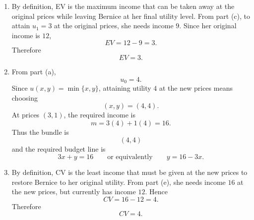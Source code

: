 \documentclass[12pt]{article}
\begin{document}
\begin{enumerate}[label=(\alph*)]
\begin{center}
    \end{center}

    \item
    By definition, EV is the maximum income that can be taken away at the original prices while leaving Bernice at her final utility level.
    From part (c), to attain \(u_1=3\) at the original prices, she needs income \(9\). Since her original income is \(12\),
    \[
    EV=12-9=3.
    \]
    Therefore
    \[
    \boxed{EV=3.}
    \]
\newpage
    \item
    From part (a),
    \[
    u_0=4.
    \]
    Since \(u(x,y)=\min\{x,y\}\), attaining utility \(4\) at the new prices means choosing
    \[
    (x,y)=(4,4).
    \]
    At prices \((3,1)\), the required income is
    \[
    m=3(4)+1(4)=16.
    \]
    Thus the bundle is
    \[
    \boxed{(4,4)}
    \]
    and the required budget line is
    \[
    \boxed{3x+y=16}
    \qquad\text{or equivalently}\qquad
    \boxed{y=16-3x.}
    \]

    \begin{center}
    \end{center}

    \item
    By definition, CV is the least income that must be given at the new prices to restore Bernice to her original utility.
    From part (e), she needs income \(16\) at the new prices, but currently has income \(12\). Hence
    \[
    CV=16-12=4.
    \]
    Therefore
    \[
    \boxed{CV=4.}
    \]
\end{enumerate}
\end{document}
